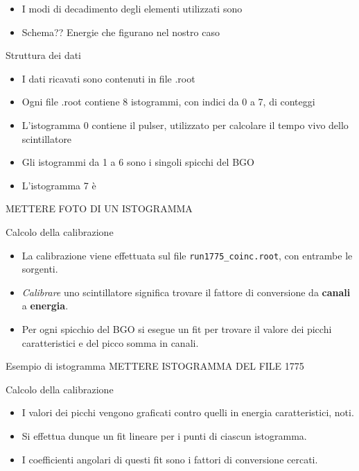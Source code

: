 \documentclass [xcolor=svgnames] {beamer}
\begin{document}
\begin{frame}
	\begin{itemize}
		\item I modi di decadimento degli elementi utilizzati sono
		\item Schema?? Energie che figurano nel nostro caso
	\end{itemize}
\end{frame}

\begin{frame}{Struttura dei dati}
	\begin{itemize}
		\item I dati ricavati sono contenuti in file .root
		\item Ogni file .root contiene 8 istogrammi, con indici da 0 a 7, di conteggi
		\item L'istogramma 0 contiene il pulser, utilizzato per calcolare il tempo vivo dello scintillatore
		\item Gli istogrammi da 1 a 6 sono i singoli spicchi del BGO
		\item L'istogramma 7 è
	\end{itemize}
\end{frame}

\begin{frame}
	METTERE FOTO DI UN ISTOGRAMMA
\end{frame}

\begin{frame}{Calcolo della calibrazione}
	\begin{itemize}
		\item La calibrazione viene effettuata sul file \texttt{run1775\_coinc.root}, con entrambe le sorgenti.
		\item \emph{Calibrare} uno scintillatore significa trovare il fattore di conversione da \textbf{canali} a \textbf{energia}.
		\item Per ogni spicchio del BGO si esegue un fit per trovare il valore dei picchi caratteristici e del picco somma in canali.
	\end{itemize}
\end{frame}

\begin{frame}{Esempio di istogramma}
	METTERE ISTOGRAMMA DEL FILE 1775
\end{frame}

\begin{frame}{Calcolo della calibrazione}
	\begin{itemize}
			\item I valori dei picchi vengono graficati contro quelli in energia caratteristici, noti.
		\item Si effettua dunque un fit lineare per i punti di ciascun istogramma.
		\item I coefficienti angolari di questi fit sono i fattori di conversione cercati.
	\end{itemize}
\end{frame}
\end{document}
